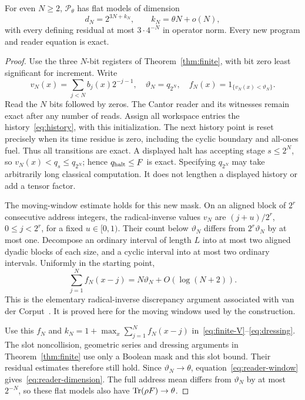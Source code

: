 \begin{lemma}\label{lem:reader-finite}
For even $N\ge2$, $\mathcal P_\theta$ has flat models of dimension
\begin{equation}\label{eq:reader-dimension}
 d_N=2^{3N+k_N},\qquad k_N=\theta N+o(N),
\end{equation}
with every defining residual at most $3\cdot4^{-N}$ in operator norm. Every new program and reader equation is exact.
\end{lemma}
\begin{proof}
Use the three $N$-bit registers of Theorem~\ref{thm:finite}, with bit zero least significant for increment. Write
\[
 v_N(x)=\sum_{j<N}b_j(x)2^{-j-1},\quad
 \vartheta_N=q_{2^N},\quad f_N(x)=1_{\{v_N(x)<\vartheta_N\}}.
\]
Read the $N$ bits followed by zeros. The Cantor reader and its witnesses remain exact after any number of reads. Assign all workspace entries the history~\eqref{eq:history}, with this initialization. The next history point is reset precisely when its time residue is zero, including the cyclic boundary and all-ones fuel. Thus all transitions are exact. A displayed halt has accepting stage $s\le2^N$, so $v_N(x)<q_s\le q_{2^N}$; hence $q_{\rm halt}\le F$ is exact. Specifying $q_{2^N}$ may take arbitrarily long classical computation. It does not lengthen a displayed history or add a tensor factor.

The moving-window estimate holds for this new mask. On an aligned block of $2^r$ consecutive address integers, the radical-inverse values $v_N$ are $(j+u)/2^r$, $0\le j<2^r$, for a fixed $u\in[0,1)$. Their count below $\vartheta_N$ differs from $2^r\vartheta_N$ by at most one. Decompose an ordinary interval of length $L$ into at most two aligned dyadic blocks of each size, and a cyclic interval into at most two ordinary intervals. Uniformly in the starting point,
\begin{equation}\label{eq:reader-window}
 \sum_{j=1}^Nf_N(x-j)=N\vartheta_N+O(\log(N+2)).
\end{equation}
This is the elementary radical-inverse discrepancy argument associated with van der Corput~\cite{vdC35}. It is proved here for the moving windows used by the construction.

Use this $f_N$ and $k_N=1+\max_x\sum_{j=1}^Nf_N(x-j)$ in~\eqref{eq:finite-V}--\eqref{eq:dressing}. The slot noncollision, geometric series and dressing arguments in Theorem~\ref{thm:finite} use only a Boolean mask and this slot bound. Their residual estimates therefore still hold. Since $\vartheta_N\to\theta$, equation~\eqref{eq:reader-window} gives~\eqref{eq:reader-dimension}. The full address mean differs from $\vartheta_N$ by at most $2^{-N}$, so these flat models also have $\operatorname{Tr}(\rho F)\to\theta$.
\end{proof}

